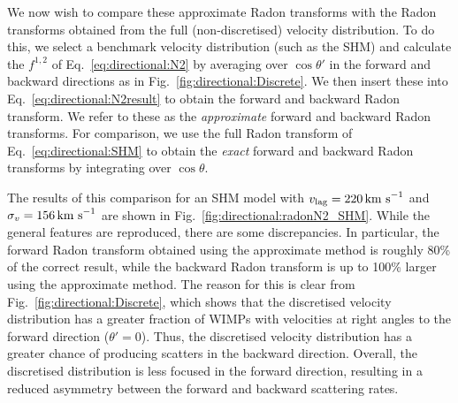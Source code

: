 We now wish to compare these approximate Radon transforms with the Radon transforms obtained from the full (non-discretised) velocity distribution. To do this, we select a benchmark velocity distribution (such as the SHM) and calculate the $f^{1,2}$ of Eq.~\ref{eq:directional:N2} by averaging over $\cos\theta'$ in the forward and backward directions as in Fig.~\ref{fig:directional:Discrete}. We then insert these into Eq.~\ref{eq:directional:N2result} to obtain the forward and backward Radon transform. We refer to these as the \textit{approximate} forward and backward Radon transforms. For comparison, we use the full Radon transform of Eq.~\ref{eq:directional:SHM} to obtain the \textit{exact} forward and backward Radon transforms by integrating over $\cos\theta$. 


The results of this comparison for an SHM model with $v_\textrm{lag} = 220 \,\textrm{km s}^{-1}$ and $\sigma_v = 156 \,\textrm{km s}^{-1}$ are shown in Fig.~\ref{fig:directional:radonN2_SHM}. While the general features are reproduced, there are some discrepancies. In particular, the forward Radon transform obtained using the approximate method is roughly 80\% of the correct result, while the backward Radon transform is up to 100\% larger using the approximate method. The reason for this is clear from Fig.~\ref{fig:directional:Discrete}, which shows that the discretised velocity distribution has a greater fraction of WIMPs with velocities at right angles to the forward direction ($\theta' = 0$). Thus, the discretised velocity distribution has a greater chance of producing scatters in the backward direction. Overall, the discretised distribution is less focused in the forward direction, resulting in a reduced asymmetry between the forward and backward scattering rates. 

